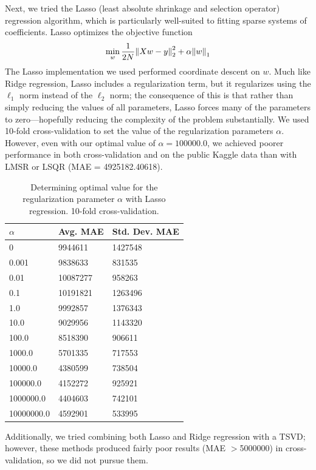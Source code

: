\documentclass[11pt]{amsart}
\begin{document}
Next, we tried the Lasso (least absolute shrinkage and selection operator) regression algorithm, which is particularly well-suited to fitting sparse systems of coefficients. Lasso optimizes the objective function
$$\min_w \frac{1}{2 N} \norm{X w - y}_2^2 + \alpha \norm{w}_1$$
The Lasso implementation we used performed coordinate descent on $w$. Much like Ridge regression, Lasso includes a regularization term, but it regularizes using the $\ell_1$ norm instead of the $\ell_2$ norm; the consequence of this is that rather than simply reducing the values of all parameters, Lasso forces many of the parameters to zero---hopefully reducing the complexity of the problem substantially. We used 10-fold cross-validation to set the value of the regularization parameters $\alpha$. However, even with our optimal value of $\alpha = 100000.0$, we achieved poorer performance in both cross-validation and on the public Kaggle data than with LMSR or LSQR (MAE = 4925182.40618). 

\begin{table}[h]
\begin{tabular}{@{}lll@{}}
\toprule
$\alpha$ & Avg. MAE & Std. Dev. MAE \\ \midrule
  0  & 9944611   & 1427548 \\
                0.001  & 9838633   & 831535  \\
                 0.01  & 10087277  & 958263  \\
                  0.1  & 10191821  & 1263496 \\
                  1.0  & 9992857   & 1376343 \\
                 10.0  & 9029956   & 1143320 \\
                100.0  & 8518390   & 906611  \\
               1000.0  & 5701335   & 717553  \\
              10000.0  & 4380599   & 738504  \\
             100000.0  & 4152272   & 925921  \\
            1000000.0  & 4404603   & 742101  \\
           10000000.0  & 4592901   & 533995  \\\bottomrule
\end{tabular}
\caption{Determining optimal value for the regularization parameter $\alpha$ with Lasso regression. 10-fold cross-validation.}
\end{table}

Additionally, we tried combining both Lasso and Ridge regression with a TSVD; however, these methods produced fairly poor results (MAE $>$5000000) in cross-validation, so we did not pursue them.
\end{document}

